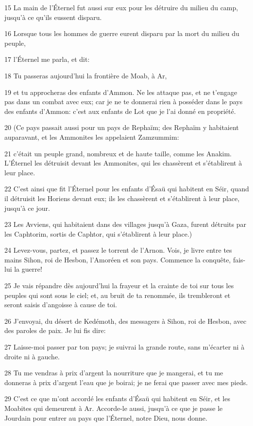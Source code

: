\par 15 La main de l'Éternel fut aussi sur eux pour les détruire du milieu du camp, jusqu'à ce qu'ils eussent disparu.
\par 16 Lorsque tous les hommes de guerre eurent disparu par la mort du milieu du peuple,
\par 17 l'Éternel me parla, et dit:
\par 18 Tu passeras aujourd'hui la frontière de Moab, à Ar,
\par 19 et tu approcheras des enfants d'Ammon. Ne les attaque pas, et ne t'engage pas dans un combat avec eux; car je ne te donnerai rien à posséder dans le pays des enfants d'Ammon: c'est aux enfants de Lot que je l'ai donné en propriété.
\par 20 (Ce pays passait aussi pour un pays de Rephaïm; des Rephaïm y habitaient auparavant, et les Ammonites les appelaient Zamzummim:
\par 21 c'était un peuple grand, nombreux et de haute taille, comme les Anakim. L'Éternel les détruisit devant les Ammonites, qui les chassèrent et s'établirent à leur place.
\par 22 C'est ainsi que fit l'Éternel pour les enfants d'Ésaü qui habitent en Séir, quand il détruisit les Horiens devant eux; ils les chassèrent et s'établirent à leur place, jusqu'à ce jour.
\par 23 Les Avviens, qui habitaient dans des villages jusqu'à Gaza, furent détruits par les Caphtorim, sortis de Caphtor, qui s'établirent à leur place.)
\par 24 Levez-vous, partez, et passez le torrent de l'Arnon. Vois, je livre entre tes mains Sihon, roi de Hesbon, l'Amoréen et son pays. Commence la conquête, fais-lui la guerre!
\par 25 Je vais répandre dès aujourd'hui la frayeur et la crainte de toi sur tous les peuples qui sont sous le ciel; et, au bruit de ta renommée, ils trembleront et seront saisis d'angoisse à cause de toi.
\par 26 J'envoyai, du désert de Kedémoth, des messagers à Sihon, roi de Hesbon, avec des paroles de paix. Je lui fis dire:
\par 27 Laisse-moi passer par ton pays; je suivrai la grande route, sans m'écarter ni à droite ni à gauche.
\par 28 Tu me vendras à prix d'argent la nourriture que je mangerai, et tu me donneras à prix d'argent l'eau que je boirai; je ne ferai que passer avec mes pieds.
\par 29 C'est ce que m'ont accordé les enfants d'Ésaü qui habitent en Séir, et les Moabites qui demeurent à Ar. Accorde-le aussi, jusqu'à ce que je passe le Jourdain pour entrer au pays que l'Éternel, notre Dieu, nous donne.
